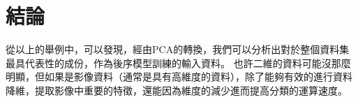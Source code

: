 \section {結論}
從以上的舉例中，可以發現，經由PCA的轉換，我們可以分析出對於整個資料集最具代表性的成份，作為後序模型訓練的輸⼊資料。
也許二維的資料可能沒那麼明顯，但如果是影像資料（通常是具有高維度的資料），除了能夠有效的進行資料降維，提取影像中重要的特徵，還能因為維度的減少進而提高分類的運算速度。

